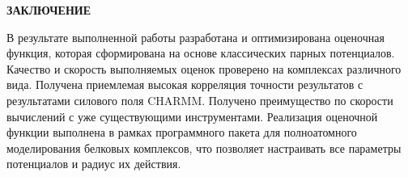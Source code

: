 \newpage
\begin{center}
  \textbf{\large ЗАКЛЮЧЕНИЕ}
\end{center}


В результате выполненной работы разработана и оптимизирована оценочная функция, которая сформирована на основе классических парных потенциалов. Качество и скорость выполняемых оценок проверено на комплексах различного вида. Получена приемлемая высокая корреляция точности результатов с результатами силового поля CHARMM. Получено преимущество по скорости вычислений с уже существующими инструментами. Реализация оценочной функции выполнена в рамках программного пакета для полноатомного моделирования белковых комплексов, что позволяет настраивать все параметры потенциалов и радиус их действия.